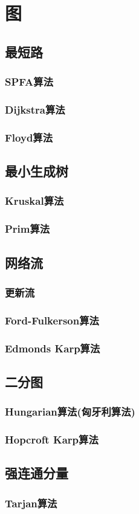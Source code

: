 
\section{图}
\subsection{最短路}
\subsubsection{SPFA算法}
\subsubsection{Dijkstra算法}
\subsubsection{Floyd算法}

\subsection{最小生成树}
\subsubsection{Kruskal算法}
\subsubsection{Prim算法}

\subsection{网络流}
\subsubsection{更新流}
\subsubsection{Ford-Fulkerson算法}
\subsubsection{Edmonds Karp算法}

\subsection{二分图}
\subsubsection{Hungarian算法(匈牙利算法)}
\subsubsection{Hopcroft Karp算法}

\subsection{强连通分量}
\subsubsection{Tarjan算法}
